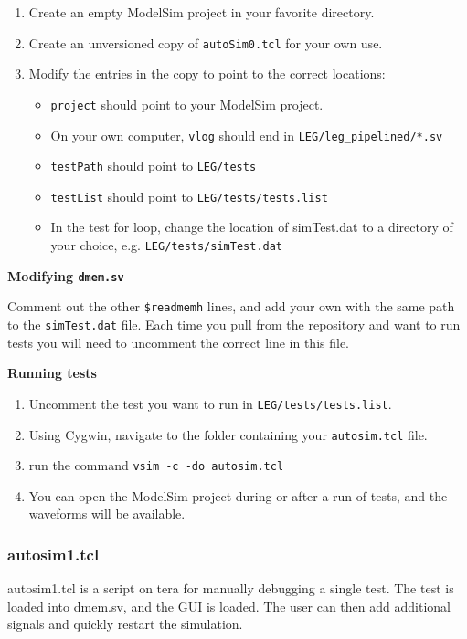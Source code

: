 \begin{enumerate}

\item Create an empty ModelSim project in your favorite directory.

\item Create an unversioned copy of \texttt{autoSim0.tcl} for your own use.

\item Modify the entries in the copy to point to the correct locations:

	\begin{itemize}

	\item \texttt{project} should point to your ModelSim project.

	\item On your own computer, \texttt{vlog} should end in \texttt{LEG/leg\_pipelined/*.sv}

	\item \texttt{testPath} should point to \texttt{LEG/tests}

	\item \texttt{testList} should point to \texttt{LEG/tests/tests.list}

	\item In the test for loop, change the location of simTest.dat to a directory 
	of your choice, e.g. \texttt{LEG/tests/simTest.dat}

	\end{itemize}

\end{enumerate}

\large \textbf{Modifying \texttt{dmem.sv}}

Comment out the other \texttt{\$readmemh} lines, and add your own with 
the same path to the \texttt{simTest.dat} file. Each time you pull from 
the repository and want to run tests you will need to uncomment 
the correct line in this file.

\bigskip
\textbf{Running tests}

\begin{enumerate}
\item Uncomment the test you want to run in \texttt{LEG/tests/tests.list}.

\item Using Cygwin, navigate to the folder containing your \texttt{autosim.tcl} file. 

\item run the command \texttt{vsim -c -do autosim.tcl}

\item You can open the ModelSim project during or after a run of tests,
and the waveforms will be available.
\end{enumerate}

\subsubsection{autosim1.tcl}
autosim1.tcl is a script on tera for manually debugging a single test. 
The test is loaded into dmem.sv, and the GUI is loaded. 
The user can then add additional signals and quickly restart the simulation. 
